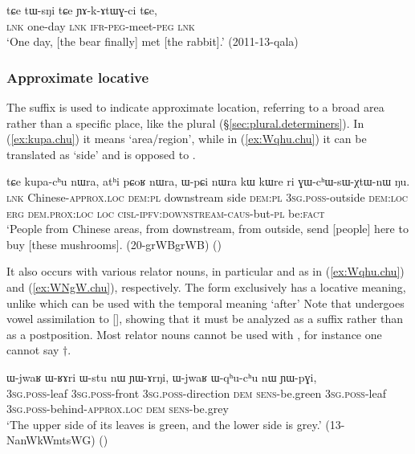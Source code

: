  \begin{exe}
\ex \label{ex:tWsNi.tCe}
\gll   tɕe tɯ-sŋi tɕe ɲɤ-k-ɤtɯɣ-ci tɕe, \\
\textsc{lnk} one-day \textsc{lnk} \textsc{ifr}-\textsc{peg}-meet-\textsc{peg} \textsc{lnk} \\
\glt  `One day, [the bear finally] met [the rabbit].' (2011-13-qala)
\end{exe}


\subsubsection{Approximate locative} \label{sec:approximate.locative}
The suffix  is used to indicate approximate location, referring to a broad area rather than a specific place, like the plural  (§\ref{sec:plural.determiners}). In (\ref{ex:kupa.chu}) it means `area/region', while in (\ref{ex:Wqhu.chu}) it can be translated as `side' and is opposed to .
 
 \begin{exe}
\ex \label{ex:kupa.chu}
 \gll  tɕe kupa-cʰu nɯra, atʰi pɕoʁ nɯra, ɯ-pɕi nɯra kɯ kɯre ri ɣɯ-cʰɯ-sɯ-χtɯ-nɯ ŋu.  \\
 \textsc{lnk} Chinese-\textsc{approx}.\textsc{loc} \textsc{dem}:\textsc{pl}  downstream side \textsc{dem}:\textsc{pl} \textsc{3sg}.\textsc{poss}-outside \textsc{dem}:\textsc{loc} \textsc{erg} \textsc{dem}.\textsc{prox}:\textsc{loc} \textsc{loc} \textsc{cisl}-\textsc{ipfv}:\textsc{downstream}-\textsc{caus}-but-\textsc{pl} be:\textsc{fact} \\
 \glt `People from Chinese areas, from downstream, from outside, send [people] here to buy [these mushrooms]. (20-grWBgrWB) ()
 \end{exe} 
 
 It also occurs with various relator nouns, in particular  and  as in (\ref{ex:Wqhu.chu}) and (\ref{ex:WNgW.chu}), respectively. The form  exclusively has a locative meaning, unlike  which can be used with the temporal meaning `after' Note that  undergoes vowel assimilation to [], showing that it must be analyzed as a suffix rather than as a postposition. Most relator nouns cannot be used with , for instance one cannot say $\dagger$.

  \begin{exe}
\ex \label{ex:Wqhu.chu}
 \gll  ɯ-jwaʁ ɯ-ʁɤri ɯ-stu nɯ ɲɯ-ɤrŋi, ɯ-jwaʁ ɯ-qʰu-cʰu nɯ ɲɯ-pɣi, \\
 \textsc{3sg}.\textsc{poss}-leaf  \textsc{3sg}.\textsc{poss}-front \textsc{3sg}.\textsc{poss}-direction \textsc{dem} \textsc{sens}-be.green   \textsc{3sg}.\textsc{poss}-leaf  \textsc{3sg}.\textsc{poss}-behind-\textsc{approx}.\textsc{loc} \textsc{dem} \textsc{sens}-be.grey \\
 \glt  `The upper side of its leaves is green, and the lower side is grey.' (13-NanWkWmtsWG) ()
  \end{exe}
  
